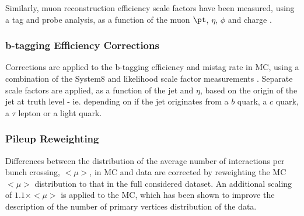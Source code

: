 Similarly, muon reconstruction efficiency scale factors
have been measured, using a \Zmumu tag and probe analysis, 
as a function of the muon $\pt$, $\eta$, $\phi$ and charge \cite{MuonReconstruction}.

\subsubsection{b-tagging Efficiency Corrections}
\label{sec:presel:BTagEffCorr}

Corrections are applied to the b-tagging efficiency and mistag rate in
MC, using a combination of the System8 and likelihood scale
factor measurements \cite{BtaggingScaleFactors}. Separate scale factors are applied, 
as a function of the jet \pt and $\eta$, 
based on the origin of the jet at truth level - ie. depending on if the jet originates from a $b$ quark, a $c$ quark, a $\tau$ lepton 
or a light quark.

\subsubsection{Pileup Reweighting}
\label{sec:presel:PileupCorr}

Differences between the distribution of the average number of
interactions per bunch crossing, $<\mu>$, in MC and data are
corrected by reweighting the MC $<\mu>$ distribution to that in the
full considered dataset. An additional scaling of $1.1 \times <\mu>$
is applied to the MC, which has been shown to improve the description
of the number of primary vertices distribution of the data.


